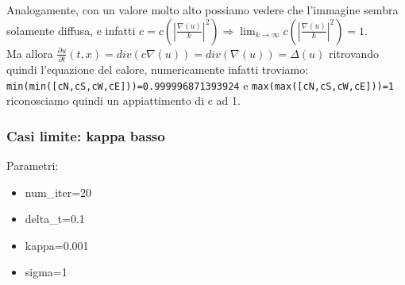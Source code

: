 Analogamente, con un valore molto alto possiamo vedere che l'immagine sembra solamente diffusa, e infatti $c=c(|\frac{\nabla(u)}{k}|^2)\Longrightarrow\lim_{k\to\infty}c(|\frac{\nabla(u)}{k}|^2)=1$.\\
Ma allora $\frac{\partial u}{\partial t}(t,x)=div(c\nabla(u))=div(\nabla(u))=\Delta(u)$ ritrovando quindi l'equazione del calore, numericamente infatti troviamo:
\texttt{min(min([cN,cS,cW,cE]))=0.999996871393924} e \texttt{max(max([cN,cS,cW,cE]))=1}
riconosciamo quindi un appiattimento di c ad 1.

\newpage
\subsubsection{Casi limite: kappa basso}
Parametri:
\begin{itemize}
    \item num\_iter=20
    \item delta\_t=0.1
    \item kappa=0.001
    \item sigma=1
\end{itemize}

